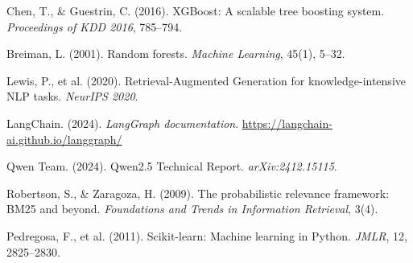 \documentclass[12pt, a4paper]{article}
\begin{document}
\begin{enumerate}[leftmargin=1.6em, label={[\arabic*]}]
  \item Chen, T., \& Guestrin, C. (2016). XGBoost: A scalable tree boosting system.
        \textit{Proceedings of KDD 2016}, 785--794.

  \item Breiman, L. (2001). Random forests. \textit{Machine Learning}, 45(1), 5--32.

  \item Lewis, P., et al. (2020). Retrieval-Augmented Generation for knowledge-intensive
        NLP tasks. \textit{NeurIPS 2020}.

  \item LangChain. (2024). \textit{LangGraph documentation}.
        \url{https://langchain-ai.github.io/langgraph/}

  \item Qwen Team. (2024). Qwen2.5 Technical Report. \textit{arXiv:2412.15115}.

  \item Robertson, S., \& Zaragoza, H. (2009). The probabilistic relevance framework:
        BM25 and beyond. \textit{Foundations and Trends in Information Retrieval}, 3(4).

  \item Pedregosa, F., et al. (2011). Scikit-learn: Machine learning in Python.
        \textit{JMLR}, 12, 2825--2830.
\end{enumerate}
\end{document}
